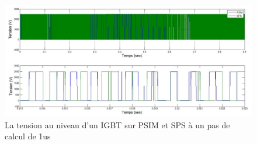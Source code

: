 \documentclass[11pt,letterpaper,final]{report}
\begin{document}
\begin{figure}[h!]
\centering
\includegraphics[scale=0.5]{Fig/DCPDCN/DCPTensionIGBT1u.jpg}
\caption{La tension au niveau d'un IGBT sur PSIM et SPS à un pas de calcul de 1us}
\label{DC_IG_ten_1}
\end{figure}
\end{document}
